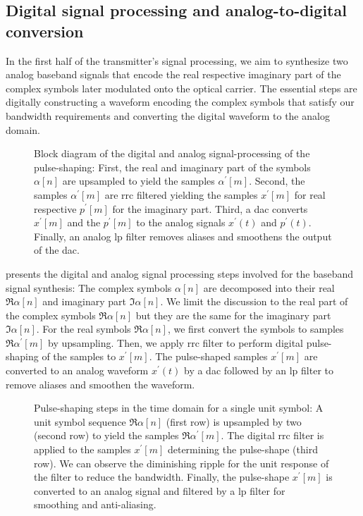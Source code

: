 \subsection{Digital signal processing and analog-to-digital conversion}

In the first half of the transmitter's signal processing, we aim to synthesize two analog baseband signals that encode the real respective imaginary part of the complex symbols later modulated onto the optical carrier.
The essential steps are digitally constructing a waveform encoding the complex symbols that satisfy our bandwidth requirements and converting the digital waveform to the analog domain.

\begin{figure}[htb]
	\centering
	
	\caption{Block diagram of the digital and analog signal-processing of the pulse-shaping: First, the real and imaginary part of the symbols $\alpha[n]$ are upsampled to yield the samples $\alpha^\prime[m]$. Second, the samples $\alpha^\prime[m]$ are \gls{rrc} filtered yielding the samples $x^\prime[m]$ for real respective $p^\prime[m]$ for the imaginary part. Third, a \gls{dac} converts $x^\prime[m]$ and the $p^\prime[m]$ to the analog signals $x^\prime(t)$ and $p^\prime(t)$. Finally, an analog \gls{lp} filter removes aliases and smoothens the output of the \gls{dac}.}\label{fig:pulse_shaping_block}
\end{figure}

 presents the digital and analog signal processing steps involved for the baseband signal synthesis:
The complex symbols $\alpha[n]$ are decomposed into their real $\Re\alpha[n]$ and imaginary part $\Im\alpha[n]$.
We limit the discussion to the real part of the complex symbols $\Re\alpha[n]$ but they are the same for the imaginary part $\Im\alpha[n]$.
For the real symbols $\Re\alpha[n]$, we first convert the symbols to samples $\Re\alpha^\prime[m]$ by upsampling.
Then, we apply \gls{rrc} filter to perform digital pulse-shaping of the samples to $x^\prime[m]$.
The pulse-shaped samples $x^\prime[m]$ are converted to an analog waveform $x^\prime(t)$ by a \gls{dac} followed by an \gls{lp} filter to remove aliases and smoothen the waveform.

\begin{figure}[htb]
	\centering
	
	\caption{Pulse-shaping steps in the time domain for a single unit symbol: A unit symbol sequence $\Re\alpha[n]$ (first row) is upsampled by two (second row) to yield the samples $\Re\alpha^\prime[m]$. The digital \gls{rrc} filter is applied to the samples $x^\prime[m]$ determining the pulse-shape (third row). We can observe the diminishing ripple for the unit response of the filter to reduce the bandwidth. Finally, the pulse-shape $x^\prime[m]$ is converted to an analog signal and filtered by a \gls{lp} filter for smoothing and anti-aliasing.}\label{fig:pulse_shaping_unit_time}
\end{figure}

